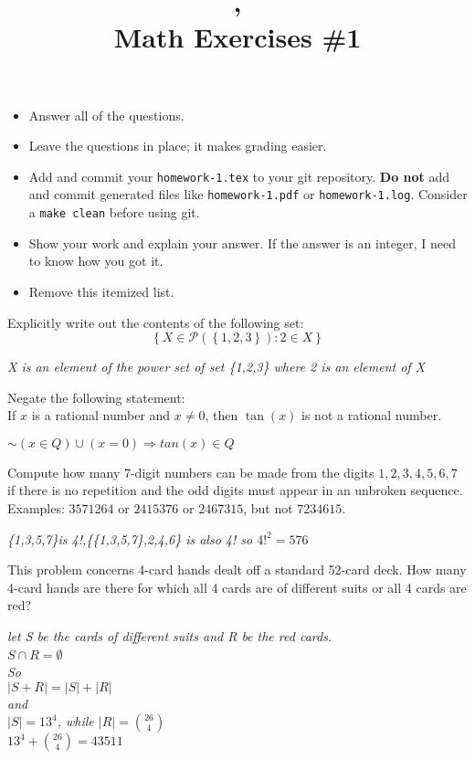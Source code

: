 \documentclass[12pt]{article}
\title{\course, \term\\Math Exercises \#1}
\begin{document}
\maketitle

% 
%
\begin{itemize}
\item Answer all of the questions.
\item Leave the questions in place; it makes grading easier. 
\item Add and commit your \texttt{homework-1.tex} to your git repository.
  \textbf{Do not} add and commit generated files like \texttt{homework-1.pdf}
  or \texttt{homework-1.log}.  Consider a \texttt{make clean} before using git.  
\item Show your work and explain your answer.  If the answer is an integer, I
  need to know how you got it.
\item Remove this itemized list.
\end{itemize}

\question Explicitly write out the contents of the following set:
\[ \left\{X\in \mathcal{P}\left(\left\{1,2,3\right\}\right) : 2\in X\right\}\]

\answer%
\emph{X is an element of the power set of set \{1,2,3\} where 2 is an element of X}

\question
Negate the following statement:\\
If $x$ is a rational number and $x\neq 0$, then $\tan(x)$
is not a rational number.

\answer%
\emph{$\sim(x\in Q)\cup(x=0) \Rightarrow tan(x)\in Q$}
  

\question Compute how many 7-digit numbers can be made from the digits
$1,2,3,4,5,6,7$ if there is no repetition and the odd digits must appear in an
unbroken sequence.  Examples: $3571264$ or $2415376$ or $2467315$, but not
$7234615$.

\answer%
\emph{\{1,3,5,7\}is 4!,\{\{1,3,5,7\},2,4,6\} is also 4! so $4!^2 = 576$}
  
\question This problem concerns 4-card hands dealt off a standard 52-card deck.
How many 4-card hands are there for which all 4 cards are of different suits or
all 4 cards are red?

\answer%
\emph{let S be the cards of different suits and R be the red cards. \\ $S\cap R = \emptyset$}
\emph{\\So \\ $|S + R|=|S|+|R|$\\and \\$|S| = 13^4$, while $|R| = {26 \choose 4}$ \\$13^4 + {26 \choose 4}=43511$}  
\end{document}
